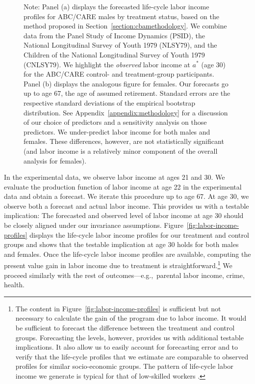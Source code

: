 \begin{figure}
Note: Panel (a) displays the forecasted life-cycle labor income profiles for ABC/CARE males by treatment status, based on the method proposed in Section~\ref{section:cbamethodology}. We combine data from the Panel Study of Income Dynamics (PSID), the National Longitudinal Survey of Youth 1979 (NLSY79), and the Children of the National Longitudinal Survey of Youth 1979 (CNLSY79). We highlight the \textit{observed} labor income at $a^*$ (age 30) for the ABC/CARE control- and treatment-group participants. Panel (b) displays the analogous figure for females. Our forecasts go up to age 67, the age of assumed retirement. Standard errors are the respective standard deviations of the empirical bootstrap distribution. See  Appendix~\ref{appendix:methodology} for a discussion of our choice of predictors and a sensitivity analysis on those predictors. We under-predict labor income for both males and females. These differences, however, are not statistically significant (and labor income is a relatively minor component of the overall analysis for females).
\end{figure}

\noindent In the experimental data, we observe labor income at ages 21 and 30. We evaluate the production function of labor income at age 22 in the experimental data and obtain a forecast. We iterate this procedure up to age 67. At age 30, we observe both a forecast and actual labor income. This provides us with a testable implication: The forecasted and observed level of labor income at age 30 should be closely aligned under our invariance assumptions. Figure~\ref{fig:labor-income-profiles} displays the life-cycle labor income profiles for our treatment and control groups and shows that the testable implication at age 30 holds for both males and females. Once the life-cycle labor income profiles are available, computing the present value gain in labor income due to treatment is straightforward.\footnote{The content in Figure~\ref{fig:labor-income-profiles} is sufficient but not necessary to calculate the gain of the program due to labor income. It would be sufficient to forecast the difference between the treatment and control groups. Forecasting the levels, however, provides us with additional testable implications. It also allow us to easily account for forecasting error and to verify that the life-cycle profiles that we estimate are comparable to observed profiles for similar socio-economic groups. The pattern of life-cycle labor income we generate is typical for that of low-skilled workers \citep{Blundell-etal_2015_J-Pub-E,Gladden_Taber_2000_WageProgression,Sanders-Taber_2012_AR,Lagakos_Moll_etal_2016_LifeCycle_NBER}.} We proceed similarly with the rest of outcomes---e.g.,\ parental labor income, crime, health.\\

